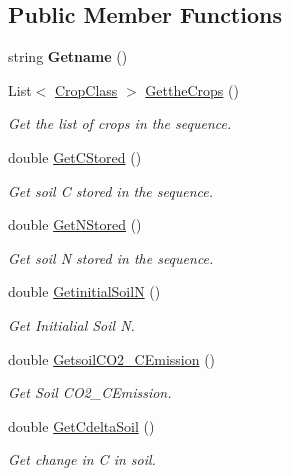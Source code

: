 \subsection*{Public Member Functions}
\begin{DoxyCompactItemize}
\item 
\mbox{\label{class_crop_sequence_class_a30d688c391ca01b201e2bc79fa76335b}} 
string {\bfseries Getname} ()
\item 
List$<$ \mbox{\hyperlink{class_crop_class}{Crop\+Class}} $>$ \mbox{\hyperlink{class_crop_sequence_class_a63762c38c16e0b0ebbf680ad1cf841d3}{Getthe\+Crops}} ()
\begin{DoxyCompactList}\small\item\em Get the list of crops in the sequence. \end{DoxyCompactList}\item 
double \mbox{\hyperlink{class_crop_sequence_class_a63cacd0e3943bbd08128560ccd116b5d}{Get\+C\+Stored}} ()
\begin{DoxyCompactList}\small\item\em Get soil C stored in the sequence. \end{DoxyCompactList}\item 
double \mbox{\hyperlink{class_crop_sequence_class_ad9a5c0b00669854a028bdf5e683c4e17}{Get\+N\+Stored}} ()
\begin{DoxyCompactList}\small\item\em Get soil N stored in the sequence. \end{DoxyCompactList}\item 
double \mbox{\hyperlink{class_crop_sequence_class_a2855cea389afe7a231c99e8dda48bcbe}{Getinitial\+SoilN}} ()
\begin{DoxyCompactList}\small\item\em Get Initialial Soil N. \end{DoxyCompactList}\item 
double \mbox{\hyperlink{class_crop_sequence_class_a4e23005ff8a380dd656fe12571788da2}{Getsoil\+C\+O2\+\_\+\+C\+Emission}} ()
\begin{DoxyCompactList}\small\item\em Get Soil C\+O2\+\_\+\+C\+Emission. \end{DoxyCompactList}\item 
double \mbox{\hyperlink{class_crop_sequence_class_aad00e0d95ab118f4bacec6a9fba51230}{Get\+Cdelta\+Soil}} ()
\begin{DoxyCompactList}\small\item\em Get change in C in soil. \end{DoxyCompactList}\item 

\end{DoxyCompactItemize}
